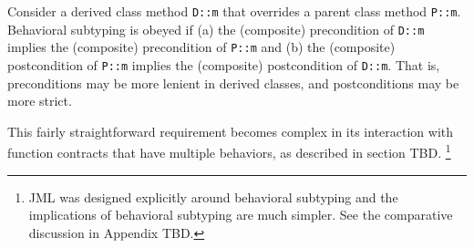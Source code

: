 Consider a derived class method \lstinline|D::m| that overrides a parent class method \lstinline|P::m|.
Behavioral subtyping is obeyed if (a) the (composite) precondition of
\lstinline|D::m| implies the (composite) precondition of 
\lstinline|P::m| and (b) the (composite) postcondition of
\lstinline|P::m| implies the (composite) postcondition of 
\lstinline|D::m|. That is, preconditions may be more lenient in derived classes, and postconditions may be more strict. 

This fairly straightforward requirement becomes complex in its interaction with function contracts that have multiple behaviors, 
as described in section TBD.
\footnote{JML was designed explicitly around behavioral subtyping and the implications of behavioral subtyping are much simpler. 
	See the comparative discussion in Appendix TBD.}